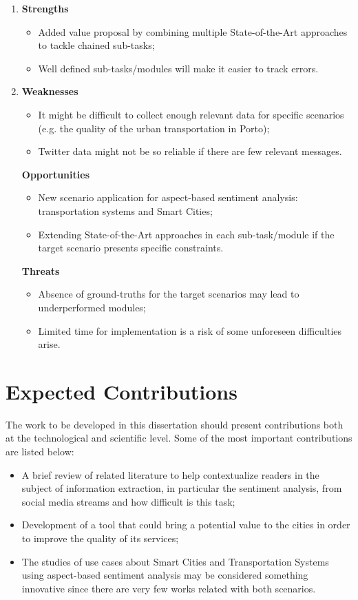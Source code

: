 \begin{enumerate}
   \item \textbf{Strengths}
   \begin{itemize}
     \item Added value proposal by combining multiple State-of-the-Art approaches to tackle chained sub-tasks;
     \item Well defined sub-tasks/modules will make it easier to track errors.
   \end{itemize}
   \item \textbf{Weaknesses}
   \begin{itemize}
     \item It might be difficult to collect enough relevant data for specific scenarios (e.g. the quality of the urban transportation in Porto);
     \item Twitter data might not be so reliable if there are few relevant messages.
   \end{itemize}
   \textbf{Opportunities}
   \begin{itemize}
     \item New scenario application for aspect-based sentiment analysis: transportation systems and Smart Cities;
     \item Extending State-of-the-Art approaches in each sub-task/module if the target scenario presents specific constraints.
   \end{itemize}
   \textbf{Threats}
   \begin{itemize}
     \item Absence of ground-truths for the target scenarios may lead to underperformed modules;
     \item Limited time for implementation is a risk of some unforeseen difficulties arise.
   \end{itemize}
\end{enumerate}

\section{Expected Contributions}

The work to be developed in this dissertation should present contributions both at the technological and scientific level. Some of the most important contributions are listed below:

\begin{itemize}
\item A brief review of related literature to help contextualize readers in the subject of information extraction, in particular the sentiment analysis, from social media streams and how difficult is this task;
\item Development of a tool that could bring a potential value to the cities in order to improve the quality of its services;
\item The studies of use cases about Smart Cities and Transportation Systems using aspect-based sentiment analysis may be considered something innovative since there are very few works related with both scenarios.
\end{itemize}

